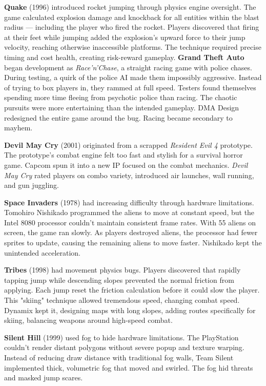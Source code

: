 \textbf{Quake} (1996) introduced rocket jumping through physics engine oversight. The game calculated explosion damage and knockback for all entities within the blast radius — including the player who fired the rocket. Players discovered that firing at their feet while jumping added the explosion's upward force to their jump velocity, reaching otherwise inaccessible platforms. The technique required precise timing and cost health, creating risk-reward gameplay.  \textbf{Grand Theft Auto} began development as \emph{Race'n'Chase}, a straight racing game with police chases. During testing, a quirk of the police AI made them impossibly aggressive. Instead of trying to box players in, they rammed at full speed.  Testers found themselves spending more time fleeing from psychotic police than racing. The chaotic pursuits were more entertaining than the intended gameplay. DMA Design redesigned the entire game around the bug. Racing became secondary to mayhem.

\textbf{Devil May Cry} (2001) originated from a scrapped \emph{Resident Evil 4} prototype. The prototype's combat engine felt too fast and stylish for a survival horror game. Capcom spun it into a new IP focused on the combat mechanics. \emph{Devil May Cry} rated players on combo variety, introduced air launches, wall running, and gun juggling.

\textbf{Space Invaders} (1978) had increasing difficulty through hardware limitations. Tomohiro Nishikado programmed the aliens to move at constant speed, but the Intel 8080 processor couldn't maintain consistent frame rates. With 55 aliens on screen, the game ran slowly. As players destroyed aliens, the processor had fewer sprites to update, causing the remaining aliens to move faster.  Nishikado kept the unintended acceleration.

\textbf{Tribes} (1998) had movement physics bugs. Players discovered that rapidly tapping jump while descending slopes prevented the normal friction from applying. Each jump reset the friction calculation before it could slow the player. This "skiing" technique allowed tremendous speed, changing combat speed. Dynamix kept it, designing maps with long slopes, adding routes specifically for skiing, balancing weapons around high-speed combat.

\textbf{Silent Hill} (1999) used fog to hide hardware limitations. The PlayStation couldn't render distant polygons without severe popup and texture warping. Instead of reducing draw distance with traditional fog walls, Team Silent implemented thick, volumetric fog that moved and swirled.  The fog hid threats and masked jump scares.

